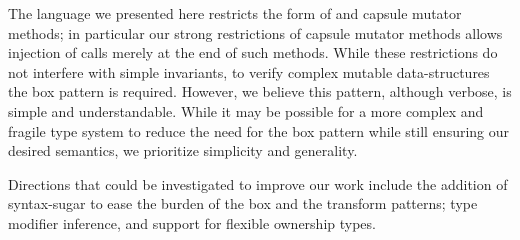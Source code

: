 

The language we presented here restricts the form of \validate{} and capsule mutator methods; in particular
our strong restrictions of capsule mutator methods
allows injection of \validate{} calls merely at the end of such methods.
While these restrictions do not interfere with simple
invariants, to verify complex mutable data-structures the box pattern is required.
However, we believe this pattern, although verbose, is simple and understandable. While it may be possible for a more
complex and fragile type system to reduce the need for the box pattern
 while still ensuring our desired semantics, we prioritize simplicity and generality.


Directions that could be investigated to improve our work include the addition of syntax-sugar to ease the burden of the box and the transform patterns; type modifier inference, and support for flexible ownership types.

